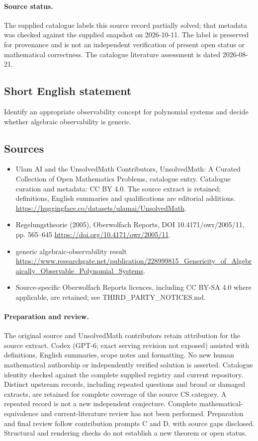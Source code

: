 \documentclass[11pt]{article}
\begin{document}
\paragraph{Source status.}
The supplied catalogue labels this source record partially solved; that metadata was checked against the supplied snapshot on 2026-10-11. The label is preserved for provenance and is not an independent verification of present open status or mathematical correctness. The catalogue literature assessment is dated 2026-08-21.
\subsection{Short English statement}
Identify an appropriate observability concept for polynomial systems and decide whether algebraic observability is generic.
\subsection{Sources}
\begin{itemize}
\item[S1] Ulam AI and the UnsolvedMath Contributors, UnsolvedMath: A Curated Collection of Open Mathematics Problems, catalogue entry. Catalogue curation and metadata: CC BY 4.0. The source extract is retained; definitions, English summaries and qualifications are editorial additions.
\url{https://huggingface.co/datasets/ulamai/UnsolvedMath}.
\item[S2] Regelungstheorie (2005), Oberwolfach Reports, DOI 10.4171/owr/2005/11, pp. 565--645
\url{https://doi.org/10.4171/owr/2005/11}.
\item[S3] generic algebraic-observability result
\url{https://www.researchgate.net/publication/228999815_Genericity_of_Algebraically_Observable_Polynomial_Systems}.
\item Source-specific Oberwolfach Reports licences, including CC BY-SA 4.0 where applicable, are retained; see THIRD\_PARTY\_NOTICES.md.
\end{itemize}
\paragraph{Preparation and review.}
The original source and UnsolvedMath contributors retain attribution for the source extract. Codex (GPT-6; exact serving revision not exposed) assisted with definitions, English summaries, scope notes and formatting. No new human mathematical authorship or independently verified solution is asserted. Catalogue identity checked against the complete supplied registry and current repository. Distinct upstream records, including repeated questions and broad or damaged extracts, are retained for complete coverage of the source CS category. A repeated record is not a new independent conjecture. Complete mathematical-equivalence and current-literature review has not been performed. Preparation and final review follow contribution prompts C and D, with source gaps disclosed. Structural and rendering checks do not establish a new theorem or open status.
\label{end:statement}
\end{document}

